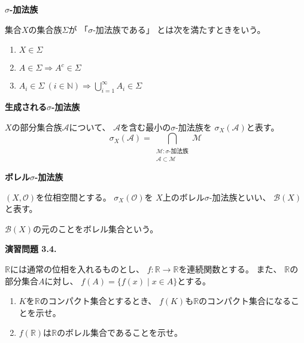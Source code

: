 \documentclass[12pt,b5paper]{ltjsarticle}
\begin{document}
\hrulefill

\textbf{$\sigma$-加法族}

集合$X$の集合族$\Sigma$が
「$\sigma$-加法族である」
とは次を満たすときをいう。
\begin{enumerate}
 \item $X \in \Sigma$
 \item $A \in \Sigma \Rightarrow A^{c}\in\Sigma$
 \item $A_{i}\in\Sigma \ (i\in\mathbb{N})
       \Rightarrow \bigcup_{i=1}^{\infty}A_{i}\in\Sigma$
\end{enumerate}

\textbf{生成される$\sigma$-加法族}

$X$の部分集合族$\mathcal{A}$について、
$\mathcal{A}$を含む最小の$\sigma$-加法族を
$\sigma_{X}(\mathcal{A})$と表す。
\begin{equation}
 \sigma_{X}(\mathcal{A})=
  \bigcap_{\substack{\mathcal{M}:\sigma\text{-加法族} \\ \mathcal{A}\subset \mathcal{M}}}\mathcal{M}
\end{equation}

\textbf{ボレル$\sigma$-加法族}

$(X,\mathcal{O})$を位相空間とする。
$\sigma_{X}(\mathcal{O})$を
$X$上のボレル$\sigma$-加法族といい、
$\mathcal{B}(X)$と表す。

$\mathcal{B}(X)$の元のことをボレル集合という。

\hrulefill

\textbf{演習問題 3.4.}

$\mathbb{R}$には通常の位相を入れるものとし、
$f : \mathbb{R}\to\mathbb{R}$を連続関数とする。
また、
$\mathbb{R}$の部分集合$A$に対し、
$f(A) = \{ f(x) \mid x\in A \}$とする。
\begin{enumerate}
 \item
      $K$を$\mathbb{R}$のコンパクト集合とするとき、
      $f(K)$も$\mathbb{R}$のコンパクト集合になることを示せ。
      
 \item
      $f(\mathbb{R})$は$\mathbb{R}$のボレル集合であることを示せ。
\end{enumerate}

\dotfill
\end{document}
